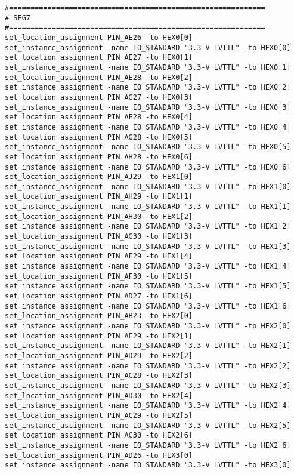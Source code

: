 \begin{verbatim}
#============================================================
# SEG7
#============================================================
set_location_assignment PIN_AE26 -to HEX0[0]
set_instance_assignment -name IO_STANDARD "3.3-V LVTTL" -to HEX0[0]
set_location_assignment PIN_AE27 -to HEX0[1]
set_instance_assignment -name IO_STANDARD "3.3-V LVTTL" -to HEX0[1]
set_location_assignment PIN_AE28 -to HEX0[2]
set_instance_assignment -name IO_STANDARD "3.3-V LVTTL" -to HEX0[2]
set_location_assignment PIN_AG27 -to HEX0[3]
set_instance_assignment -name IO_STANDARD "3.3-V LVTTL" -to HEX0[3]
set_location_assignment PIN_AF28 -to HEX0[4]
set_instance_assignment -name IO_STANDARD "3.3-V LVTTL" -to HEX0[4]
set_location_assignment PIN_AG28 -to HEX0[5]
set_instance_assignment -name IO_STANDARD "3.3-V LVTTL" -to HEX0[5]
set_location_assignment PIN_AH28 -to HEX0[6]
set_instance_assignment -name IO_STANDARD "3.3-V LVTTL" -to HEX0[6]
set_location_assignment PIN_AJ29 -to HEX1[0]
set_instance_assignment -name IO_STANDARD "3.3-V LVTTL" -to HEX1[0]
set_location_assignment PIN_AH29 -to HEX1[1]
set_instance_assignment -name IO_STANDARD "3.3-V LVTTL" -to HEX1[1]
set_location_assignment PIN_AH30 -to HEX1[2]
set_instance_assignment -name IO_STANDARD "3.3-V LVTTL" -to HEX1[2]
set_location_assignment PIN_AG30 -to HEX1[3]
set_instance_assignment -name IO_STANDARD "3.3-V LVTTL" -to HEX1[3]
set_location_assignment PIN_AF29 -to HEX1[4]
set_instance_assignment -name IO_STANDARD "3.3-V LVTTL" -to HEX1[4]
set_location_assignment PIN_AF30 -to HEX1[5]
set_instance_assignment -name IO_STANDARD "3.3-V LVTTL" -to HEX1[5]
set_location_assignment PIN_AD27 -to HEX1[6]
set_instance_assignment -name IO_STANDARD "3.3-V LVTTL" -to HEX1[6]
set_location_assignment PIN_AB23 -to HEX2[0]
set_instance_assignment -name IO_STANDARD "3.3-V LVTTL" -to HEX2[0]
set_location_assignment PIN_AE29 -to HEX2[1]
set_instance_assignment -name IO_STANDARD "3.3-V LVTTL" -to HEX2[1]
set_location_assignment PIN_AD29 -to HEX2[2]
set_instance_assignment -name IO_STANDARD "3.3-V LVTTL" -to HEX2[2]
set_location_assignment PIN_AC28 -to HEX2[3]
set_instance_assignment -name IO_STANDARD "3.3-V LVTTL" -to HEX2[3]
set_location_assignment PIN_AD30 -to HEX2[4]
set_instance_assignment -name IO_STANDARD "3.3-V LVTTL" -to HEX2[4]
set_location_assignment PIN_AC29 -to HEX2[5]
set_instance_assignment -name IO_STANDARD "3.3-V LVTTL" -to HEX2[5]
set_location_assignment PIN_AC30 -to HEX2[6]
set_instance_assignment -name IO_STANDARD "3.3-V LVTTL" -to HEX2[6]
set_location_assignment PIN_AD26 -to HEX3[0]
set_instance_assignment -name IO_STANDARD "3.3-V LVTTL" -to HEX3[0]

\end{verbatim}
